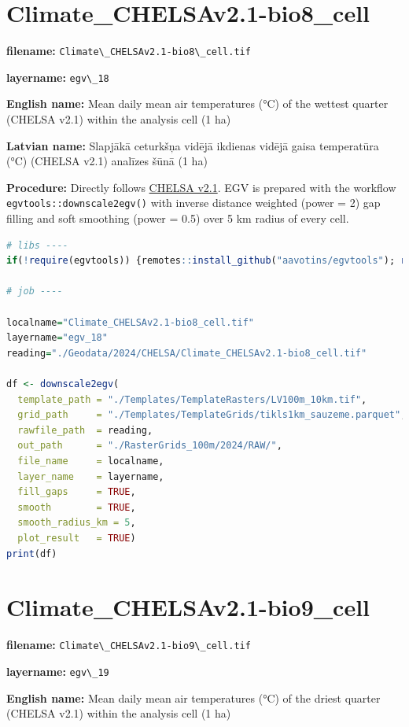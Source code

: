 \documentclass[
]{book}
\newcommand{\passthrough}[1]{#1}
\begin{document}
\section{Climate\_CHELSAv2.1-bio8\_cell}\label{ch06.018}

\textbf{filename:} \passthrough{\lstinline!Climate\_CHELSAv2.1-bio8\_cell.tif!}

\textbf{layername:} \passthrough{\lstinline!egv\_18!}

\textbf{English name:} Mean daily mean air temperatures (°C) of the wettest quarter (CHELSA v2.1) within the analysis cell (1 ha)

\textbf{Latvian name:} Slapjākā ceturkšņa vidējā ikdienas vidējā gaisa temperatūra (°C) (CHELSA v2.1) analīzes šūnā (1 ha)

\textbf{Procedure:} Directly follows \hyperref[Ch04.11]{CHELSA v2.1}. EGV is prepared with the
workflow \passthrough{\lstinline!egvtools::downscale2egv()!} with inverse distance weighted (power = 2)
gap filling and soft smoothing (power = 0.5) over 5 km radius of every cell.

\begin{lstlisting}[language=R]
# libs ----
if(!require(egvtools)) {remotes::install_github("aavotins/egvtools"); require(egvtools)}

# job ----

localname="Climate_CHELSAv2.1-bio8_cell.tif"
layername="egv_18"
reading="./Geodata/2024/CHELSA/Climate_CHELSAv2.1-bio8_cell.tif"

df <- downscale2egv(
  template_path = "./Templates/TemplateRasters/LV100m_10km.tif",
  grid_path     = "./Templates/TemplateGrids/tikls1km_sauzeme.parquet",
  rawfile_path  = reading,
  out_path      = "./RasterGrids_100m/2024/RAW/",
  file_name     = localname,
  layer_name    = layername,
  fill_gaps     = TRUE,
  smooth        = TRUE,
  smooth_radius_km = 5,
  plot_result   = TRUE)
print(df)
\end{lstlisting}

\section{Climate\_CHELSAv2.1-bio9\_cell}\label{ch06.019}

\textbf{filename:} \passthrough{\lstinline!Climate\_CHELSAv2.1-bio9\_cell.tif!}

\textbf{layername:} \passthrough{\lstinline!egv\_19!}

\textbf{English name:} Mean daily mean air temperatures (°C) of the driest quarter (CHELSA v2.1) within the analysis cell (1 ha)
\end{document}
